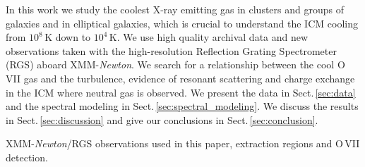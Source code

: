 \documentclass[useAMS,usenatbib]{mn2e}
\begin{document}
In this work we study the coolest X-ray emitting gas in clusters and groups of galaxies
and in elliptical galaxies, which is crucial to understand the ICM cooling from $10^8$\,K 
down to $10^4$\,K. We use high quality archival data and new observations 
taken with the high-resolution Reflection Grating Spectrometer (RGS) aboard XMM-\textit{Newton}.
We search for a relationship between the cool O\,{\small VII} gas and the turbulence,
evidence of resonant scattering and charge exchange in the ICM where neutral gas is observed.
We present the data in Sect.\,\ref{sec:data} and the spectral modeling in  
Sect.\,\ref{sec:spectral_modeling}. We discuss the results in Sect.\,\ref{sec:discussion} 
and give our conclusions in Sect.\,\ref{sec:conclusion}.

\begin{table}
\caption{XMM-\textit{Newton}/RGS observations used in this paper, extraction regions and O\,{\small VII} detection.}  
\label{table:log}      %
\renewcommand{\arraystretch}{1.1}
 \small\addtolength{\tabcolsep}{-2pt}
 

\end{table}
\end{document}
